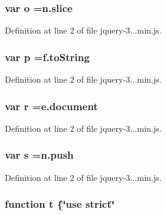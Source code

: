 \subsubsection[{o}]{\setlength{\rightskip}{0pt plus 5cm}var o =n.\+slice}\label{jquery-3_83_81_8min_8js_a400dc8109620963da8314d4bdfa14f83}


Definition at line 2 of file jquery-\/3...\+min.\+js.

\subsubsection[{p}]{\setlength{\rightskip}{0pt plus 5cm}var p =f.\+to\+String}\label{jquery-3_83_81_8min_8js_ad1707b001240e9c8298830073364c8bf}


Definition at line 2 of file jquery-\/3...\+min.\+js.

\subsubsection[{r}]{\setlength{\rightskip}{0pt plus 5cm}var r =e.\+document}\label{jquery-3_83_81_8min_8js_a07c0e0a63b5b484807c0331c78558c9e}


Definition at line 2 of file jquery-\/3...\+min.\+js.

\subsubsection[{s}]{\setlength{\rightskip}{0pt plus 5cm}var s =n.\+push}\label{jquery-3_83_81_8min_8js_ad9a7d92cb87932d25187fdec3ba1b621}


Definition at line 2 of file jquery-\/3...\+min.\+js.

\subsubsection[{t}]{\setlength{\rightskip}{0pt plus 5cm}function t \{\char`\"{}use strict\char`\"{}}\label{jquery-3_83_81_8min_8js_a23c5666e83bbbceee94adcd0851f50c4}



